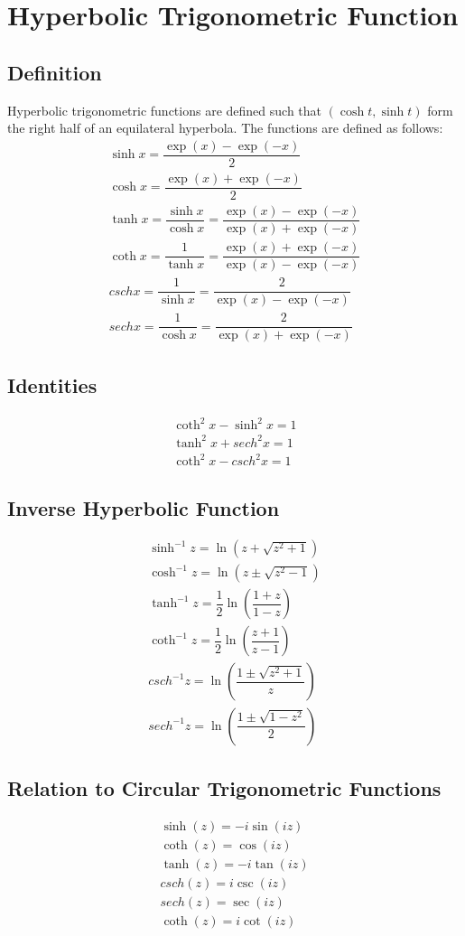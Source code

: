 \large{\chapter{Hyperbolic Trigonometric Function}}
\section{Definition}
Hyperbolic trigonometric functions are defined such that $(\cosh t,\sinh t)$ form the right half of an equilateral hyperbola. The functions are defined as follows:
\begin{align}
	\sinh x=\dfrac{\exp(x)-\exp(-x)}{2}\\
	\cosh x=\dfrac{\exp(x)+\exp(-x)}{2}\\
	\tanh x=\dfrac{\sinh x}{\cosh x}=\dfrac{\exp(x)-\exp(-x)}{\exp(x)+\exp(-x)}\\
	\coth x=\dfrac{1}{\tanh x}=\dfrac{\exp(x)+\exp(-x)}{\exp(x)-\exp(-x)}\\
	csch x=\dfrac{1}{\sinh x}=\dfrac{2}{\exp(x)-\exp(-x)}\\
	sech x=\dfrac{1}{\cosh x}=\dfrac{2}{\exp(x)+\exp(-x)}
\end{align}

\section{Identities}
\begin{align}
	\coth^2 x-\sinh^2 x=1\\
	\tanh^2 x+sech^2 x=1\\
	\coth^2 x-csch^2 x=1
\end{align}

\section{Inverse Hyperbolic Function}
\begin{align}
	\sinh^{-1} z= \ln(z+\sqrt{z^2+1})\\
	\cosh^{-1} z= \ln(z\pm\sqrt{z^2-1})\\
	\tanh^{-1} z= \dfrac{1}{2}\ln\left(\dfrac{1+z}{1-z}\right)\\
	\coth^{-1} z= \dfrac{1}{2}\ln\left(\dfrac{z+1}{z-1}\right)\\
	csch^{-1} z= \ln\left(\dfrac{1\pm\sqrt{z^2+1}}{z}\right)\\
	sech^{-1} z= \ln\left(\dfrac{1\pm\sqrt{1-z^2}}{2}\right)
\end{align}

\section{Relation to Circular Trigonometric Functions}
\begin{align}
	\sinh (z)=-i\sin (iz)\\
	\coth (z)= \cos (iz)\\
	\tanh (z)=-i \tan (iz)\\
	csch (z)=i\csc (iz)\\
	sech (z)=\sec (iz)\\
	\coth (z)=i\cot (iz)
\end{align}
